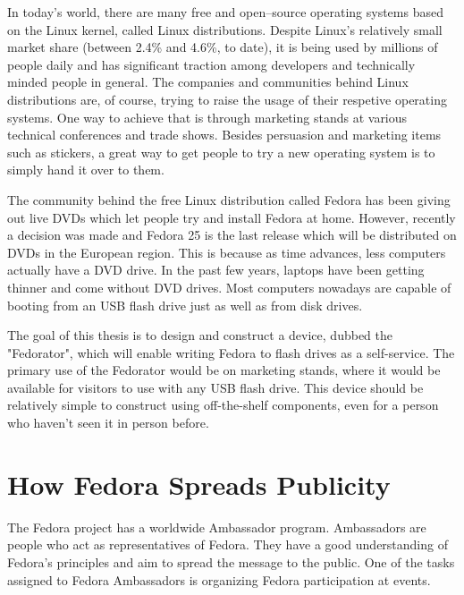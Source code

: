 \label{Introduction}
    In today's world, there are many free and open–source operating systems based on the Linux kernel, called Linux distributions\cite{whatislinux}.  Despite Linux's relatively small market share (between 2.4\% and 4.6\%, to date\cite{linuxmarketshare}), it is being used by millions of people daily and has significant traction among developers\cite{sosurvey} and technically minded people in general.  The companies and communities behind Linux distributions are, of course, trying to raise the usage of their respetive operating systems.  One way to achieve that is through marketing stands at various technical conferences and trade shows.  Besides persuasion and marketing items such as stickers, a great way to get people to try a new operating system is to simply hand it over to them.

    The community behind the free Linux distribution called Fedora\cite{fedora} has been giving out live DVDs which let people try and install Fedora at home.  However, recently a decision was made and Fedora 25 is the last release which will be distributed on DVDs in the European region.   This is because as time advances, less computers actually have a DVD drive.  In the past few years, laptops have been getting thinner and come without DVD drives\cite{laptopdvd}.  Most computers nowadays are capable of booting from an USB flash drive just as well as from disk drives\cite{fedora-how-to-live-usb}.
    
    The goal of this thesis is to design and construct a device, dubbed the "Fedorator", which will enable writing Fedora to flash drives as a self-service.  The primary use of the Fedorator would be on marketing stands, where it would be available for visitors to use with any USB flash drive.  This device should be relatively simple to construct using off-the-shelf components, even for a person who haven't seen it in person before.
    \section{How Fedora Spreads Publicity}
        The Fedora project has a worldwide Ambassador program.  Ambassadors are people who act as representatives of Fedora.  They have a good understanding of Fedora's principles and aim to spread the message to the public\cite{fedora-ambassadors}.  One of the tasks assigned to Fedora Ambassadors is organizing Fedora participation at events.
        
